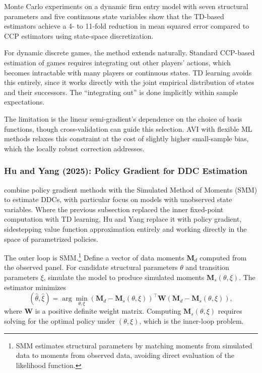 Monte Carlo experiments on a dynamic firm entry model with seven structural parameters and five continuous state variables show that the TD-based estimators achieve a 4- to 11-fold reduction in mean squared error compared to CCP estimators using state-space discretization.

For dynamic discrete games, the method extends naturally. Standard CCP-based estimation of games requires integrating out other players' actions, which becomes intractable with many players or continuous states. TD learning avoids this entirely, since it works directly with the joint empirical distribution of states and their successors. The ``integrating out'' is done implicitly within sample expectations.

The limitation is the linear semi-gradient's dependence on the choice of basis functions, though cross-validation can guide this selection. AVI with flexible ML methods relaxes this constraint at the cost of slightly higher small-sample bias, which the locally robust correction addresses.


\subsubsection{Hu and Yang (2025): Policy Gradient for DDC Estimation}

\citet{HuYang2025} combine policy gradient methods with the Simulated Method of Moments (SMM) to estimate DDCs, with particular focus on models with unobserved state variables. Where the previous subsection replaced the inner fixed-point computation with TD learning, Hu and Yang replace it with policy gradient, sidestepping value function approximation entirely and working directly in the space of parametrized policies.

The outer loop is SMM.\footnote{SMM \citep{GourierouxMonfort1993} estimates structural parameters by matching moments from simulated data to moments from observed data, avoiding direct evaluation of the likelihood function.} Define a vector of data moments $\mathbf{M}_d$ computed from the observed panel. For candidate structural parameters $\theta$ and transition parameters $\xi$, simulate the model to produce simulated moments $\mathbf{M}_s(\theta, \xi)$. The estimator minimizes
\begin{equation}
(\hat{\theta}, \hat{\xi}) = \arg\min_{\theta, \xi} \left(\mathbf{M}_d - \mathbf{M}_s(\theta, \xi)\right)^\top \mathbf{W} \left(\mathbf{M}_d - \mathbf{M}_s(\theta, \xi)\right), \label{eq:hy_outer}
\end{equation}
where $\mathbf{W}$ is a positive definite weight matrix. Computing $\mathbf{M}_s(\theta, \xi)$ requires solving for the optimal policy under $(\theta, \xi)$, which is the inner-loop problem.

